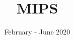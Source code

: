 \documentclass[]{slides}
\title{MIPS}
\date{February - June 2020}
\begin{document}
\printpdftrue %
\begin{frame} \titlepage \end{frame}

\end{document}
